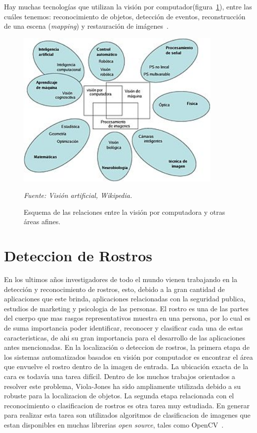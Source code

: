 Hay muchas tecnologías que utilizan la visión por computador(figura~\ref{fig:esquema_vision_computador}), entre las cuáles tenemos: reconocimiento de objetos, detección de eventos, reconstrucción de una escena (\textit{mapping}) y restauración de imágenes~\cite{15VC}.


\begin{figure}[H]
		\centering
		\includegraphics[width=100mm]{./Imagenes/esquema_vision_computador.jpg}
		\caption{Esquema de las relaciones entre la visión por computadora y otras áreas afines.}
		\vspace{0.15cm}
		\textit{Fuente: Visión artificial, Wikipedia.}
		\label{fig:esquema_vision_computador}
\end{figure}  


\section{Deteccion de Rostros}
En los ultimos años investigadores de todo el mundo vienen trabajando en la detección y reconocimiento de rostros, esto, debido a la gran cantidad de aplicaciones que este brinda, aplicaciones relacionadas con la seguridad publica, estudios de marketing y psicologia de las personas. El rostro es una de las partes del cuerpo que mas rasgos representativos muestra en una persona, por lo cual es de suma importancia poder identificar, reconocer y clasificar cada una de estas caracteristicas, de ahi su gran importancia para el desarrollo de las aplicaciones antes mencionadas. En la localización o deteccion de rostros, la primera etapa de los sistemas automatizados basados en visión por computador es encontrar el área que envuelve el rostro dentro de la imagen de entrada. La ubicación exacta de la cara es todavía una tarea difícil. Dentro de los muchos trabajos orientados a resolver este problema, Viola-Jones ha sido ampliamente utilizada debido a su robuste para la localizacion de objetos. La segunda etapa relacionada con el reconocimiento o clasificacion de rostros es otra tarea muy estudiada. En generar para realizar esta tarea son utilizados algoritmos de clasificacion de imagenes que estan disponibles en muchas librerias \textit{open source}, tales como OpenCV~\cite{20padilla2012evaluation}.

